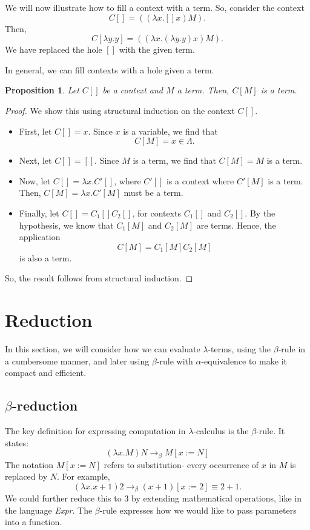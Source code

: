 \documentclass[a4paper, openany]{memoir}
\newtheorem{proposition}{Proposition}[section]
\theoremstyle{definition}
\begin{document}
    We will now illustrate how to fill a context with a term. So, consider the context 
    \[C[] = ((\lambda x. [] x) M).\]
    Then, 
    \[C[\lambda y.y] = ((\lambda x.(\lambda y.y) x) M).\]
    We have replaced the hole $[]$ with the given term.

    In general, we can fill contexts with a hole given a term.
    \begin{proposition}
        Let $C[]$ be a context and $M$ a term. Then, $C[M]$ is a term.
    \end{proposition}
    \begin{proof}
        We show this using structural induction on the context $C[]$.
        \begin{itemize}
            \item First, let $C[] = x$. Since $x$ is a variable, we find that
            \[C[M] = x \in \Lambda.\]
            \item Next, let $C[] = []$. Since $M$ is a term, we find that $C[M] = M$ is a term.
            \item Now, let $C[] = \lambda x. C'[]$, where $C'[]$ is a context where $C'[M]$ is a term. Then, $C[M] = \lambda x. C'[M]$ must be a term.
            \item Finally, let $C[] = C_1[] C_2[]$, for contexts $C_1[]$ and $C_2[]$. By the hypothesis, we know that $C_1[M]$ and $C_2[M]$ are terms. Hence, the application
            \[C[M] = C_1[M] C_2[M]\]
            is also a term.
        \end{itemize}
        So, the result follows from structural induction.
    \end{proof}
    \newpage

    \section{Reduction}
    In this section, we will consider how we can evaluate $\lambda$-terms, using the $\beta$-rule in a cumbersome manner, and later using $\beta$-rule with $\alpha$-equivalence to make it compact and efficient.

    \subsection{$\beta$-reduction}
    The key definition for expressing computation in $\lambda$-calculus is the $\beta$-rule. It states:
    \[(\lambda x. M) N \to_\beta M[x := N]\]
    The notation $M[x := N]$ refers to substitution- every occurrence of $x$ in $M$ is replaced by $N$. For example,
    \[(\lambda x. x+1) 2 \to_\beta (x + 1)[x := 2] \equiv 2 + 1.\]
    We could further reduce this to $3$ by extending mathematical operations, like in the language \textit{Expr}. The $\beta$-rule expresses how we would like to pass parameters into a function.
\end{document}
